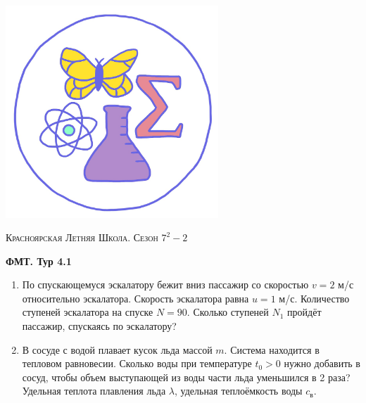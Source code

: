 \colorbox{white!10!}{
    \begin{minipage}{0.2\textwidth}
       \begin{flushleft}
        \includegraphics[width = 0.6\textwidth]{Эмблема.png}
       \end{flushleft}
    \end{minipage}
    \begin{minipage}[t]{0.7 \textwidth}
        \begin{center}
            {\huge \textsc{Красноярская Летняя Школа. Сезон $7^2 - 2$}}
            \vspace{0.25cm}
            
            { \huge \textbf{ФМТ. Тур 4.1}}
        \end{center}
        \vspace{0.05cm}
    \end{minipage}
}

\begin{enumerate}
    \item По спускающемуся эскалатору бежит вниз пассажир со скоростью $v = 2$ м/с относительно эскалатора. Скорость эскалатора равна $u = 1$ м/с. Количество ступеней эскалатора на спуске $N =90$. Сколько ступеней $N_1$ пройдёт пассажир, спускаясь по эскалатору?
	\item В сосуде с водой плавает кусок льда массой $m$. Система находится в тепловом равновесии. Сколько воды при температуре $t_0 > 0$ нужно добавить в сосуд, чтобы объем выступающей из воды части льда уменьшился в 2 раза? Удельная теплота плавления
    льда $\lambda$, удельная теплоёмкость воды $c_{\text{в}}$.  
\end{enumerate}
